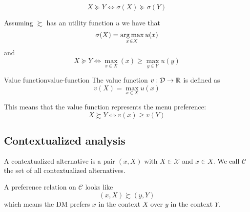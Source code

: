 \documentclass[12pt]{extarticle}
\begin{document}
\begin{corollary}{}{}
    \begin{equation}
        X \succeq Y \iff \sigma(X) \succeq \sigma(Y)
    \end{equation}
\end{corollary}

Assuming $\succsim$ has an utility function $u$ we have that
\begin{equation}
    \sigma(X) = \operatorname*{arg\,max}_{x \in X} u(x)
\end{equation}
and
\begin{equation}
    X \succeq Y \iff \max_{x \in X} (x) \geq \max_{y \in Y} u(y)
\end{equation}

\begin{definition}{Value function}{value-function}
    The value function $v: \mathcal D \to \mathbb{R}$ is defined as
    \begin{equation}
        v(X) = \max_{x \in X} u(x)
    \end{equation}
\end{definition}

This means that the value function represents the menu preference:
\begin{equation}
    X \succsim Y \iff v(x) \geq v(Y)
\end{equation}

\subsection{Contextualized analysis}

A contextualized alternative is a pair $(x, X)$ with $X \in \mathcal X$ and $x \in X$.
We call $\mathcal C$ the set of all contextualized alternatives.

A preference relation on $\mathcal C$ looks like
\begin{equation}
    (x, X) \succsim (y, Y)
\end{equation}
which means the DM prefers $x$ in the context $X$ over $y$ in the context $Y$.
\end{document}
